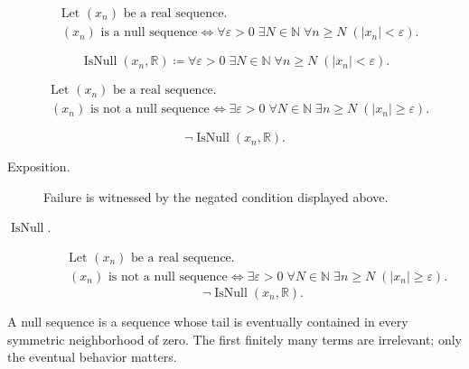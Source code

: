\begin{remark*}
\[
\begin{aligned}
&\text{Let } (x_n) \text{ be a real sequence.}\\
&(x_n) \text{ is a null sequence}
\Longleftrightarrow
\forall \varepsilon > 0\;
\exists N \in \mathbb{N}\;
\forall n \ge N\;(|x_n| < \varepsilon).
\end{aligned}
\]
\end{remark*}

\begin{remark*}
\[
\operatorname{IsNull}(x_n,\mathbb{R})
\coloneqq
\forall \varepsilon > 0\;
\exists N \in \mathbb{N}\;
\forall n \ge N\;(|x_n| < \varepsilon).
\]
\end{remark*}

\begin{remark*}
\[
\begin{aligned}
&\text{Let } (x_n) \text{ be a real sequence.}\\
&(x_n) \text{ is not a null sequence}
\Longleftrightarrow
\exists \varepsilon > 0\;
\forall N \in \mathbb{N}\;
\exists n \ge N\;(|x_n| \ge \varepsilon).
\end{aligned}
\]
\end{remark*}

\begin{remark*}
\[
\neg\operatorname{IsNull}(x_n,\mathbb{R}).
\]
\end{remark*}
\begin{remark*}
\begin{description}
  \item[Exposition.]
Failure is witnessed by the negated condition displayed above.
  \item[\(\operatorname{IsNull}.\)]
\[
\begin{aligned}
&\text{Let } (x_n) \text{ be a real sequence.}\\
&(x_n) \text{ is not a null sequence}
\Longleftrightarrow
\exists \varepsilon > 0\;
\forall N \in \mathbb{N}\;
\exists n \ge N\;(|x_n| \ge \varepsilon).
\end{aligned}
\]
\[
\neg\operatorname{IsNull}(x_n,\mathbb{R}).
\]
\end{description}
\end{remark*}

\begin{remark*}[Interpretation]
A null sequence is a sequence whose tail is eventually contained in every
symmetric neighborhood of zero. The first finitely many terms are irrelevant;
only the eventual behavior matters.
\end{remark*}

